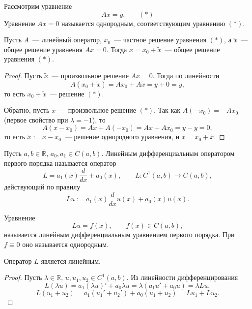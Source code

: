 \documentclass[12pt]{article}
\begin{document}
    \noindent
    Рассмотрим уравнение
    \[
    	Ax = y. \qquad (*)
    \]
    Уравнение $Ax = 0$ называется однородным, соответствующим уравнению $(*)$.
    
    \begin{theorem}
    	Пусть $A$~--- линейный оператор, $x_0$~--- частное решение уравнения $(*)$, а $\widetilde{x}$~--- общее решение уравнения $Ax = 0$. Тогда $x = x_0 + \widetilde{x}$~--- общее решение уравнения $(*)$.
    \end{theorem}
    
    \begin{proof}
    	Пусть $\widetilde{x}$~--- произвольное решение $Ax = 0$. Тогда по линейности
    	\[
    		A(x_0 + \widetilde{x}) = Ax_0 + A\widetilde{x} = y + 0 = y,
    	\]
    	то есть $x_0 + \widetilde{x}$~--- решение $(*)$.
    	
    	Обратно, пусть $x$~--- произвольное решение $(*)$. Так как $A(-x_0) = -Ax_0$ (первое свойство при $\lambda = -1$), то
    	\[
    		A(x - x_0) = Ax + A(-x_0) = Ax - Ax_0 = y - y = 0,
    	\]
    	то есть $\widetilde{x} := x - x_0$~--- решение однородного уравнения, и $x = x_0 + \widetilde{x}$.
    \end{proof}
    
    \begin{definition}
    	Пусть $a, b \in \overline{\mathbb{R}}$, $a_0, a_1 \in C(a, b)$. Линейным дифференциальным оператором первого порядка называется оператор
    	\[
    		L = a_1(x) \dfrac{d}{dx} + a_0(x), \qquad L: C^1(a, b) \rightarrow C(a, b),
    	\]
    	действующий по правилу
    	\[
    		Lu := a_1(x) \dfrac{d}{dx} u(x) + a_0(x) u(x).
    	\]
    \end{definition}
    
    \begin{definition}
    	Уравнение
    	\[
    		Lu = f(x), \qquad f(x) \in C(a, b),
    	\]
    	называется линейным дифференциальным уравнением первого порядка. При $f \equiv 0$ оно называется однородным.
    \end{definition}
    
    \begin{statement}
    	Оператор $L$ является линейным.
    \end{statement}
    
    \begin{proof}
    	Пусть $\lambda \in \mathbb{R}$, $u, u_1, u_2 \in C^1(a, b)$. Из линейности дифференцирования
    	\[
    		L(\lambda u) = a_1 (\lambda u)' + a_0 \lambda u = \lambda (a_1 u' + a_0 u) = \lambda Lu,
    	\]
    	\[
    		L(u_1 + u_2) = a_1 (u_1' + u_2') + a_0 (u_1 + u_2) = Lu_1 + Lu_2.
    	\]
    \end{proof}
    
\end{document}
